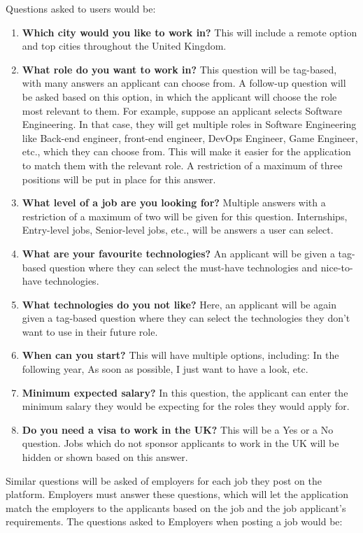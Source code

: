 Questions asked to users would be:
\begin{enumerate}
    \item \textbf{Which city would you like to work in?} This will include a remote option and top cities throughout the United Kingdom.
    \item \textbf{What role do you want to work in?} This question will be tag-based, with many answers an applicant can choose from. A follow-up question will be asked based on this option, in which the applicant will choose the role most relevant to them. For example, suppose an applicant selects Software Engineering. In that case, they will get multiple roles in Software Engineering like Back-end engineer, front-end engineer, DevOps Engineer, Game Engineer, etc., which they can choose from. This will make it easier for the application to match them with the relevant role. A restriction of a maximum of three positions will be put in place for this answer.
    \item \textbf{What level of a job are you looking for?} Multiple answers with a restriction of a maximum of two will be given for this question. Internships, Entry-level jobs, Senior-level jobs, etc., will be answers a user can select.
    \item \textbf{What are your favourite technologies?} An applicant will be given a tag-based question where they can select the must-have technologies and nice-to-have technologies. 
    \item \textbf{What technologies do you not like?} Here, an applicant will be again given a tag-based question where they can select the technologies they don't want to use in their future role.
    \item \textbf{When can you start?} This will have multiple options, including: In the following year, As soon as possible, I just want to have a look, etc.
    \item \textbf{Minimum expected salary?} In this question, the applicant can enter the minimum salary they would be expecting for the roles they would apply for. 
    \item \textbf{Do you need a visa to work in the UK?} This will be a Yes or a No question. Jobs which do not sponsor applicants to work in the UK will be hidden or shown based on this answer.
\end{enumerate}

Similar questions will be asked of employers for each job they post on the platform. Employers must answer these questions, which will let the application match the employers to the applicants based on the job and the job applicant's requirements. The questions asked to Employers when posting a job would be:

